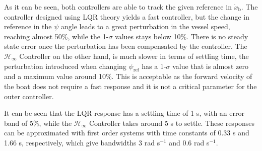 As it can be seen, both controllers are able to track the given reference in $\dot{x}_\mathrm{b}$. The controller designed using LQR theory yields a fast controller, but the change in reference in the $\psi$ angle leads to a great perturbation in the vessel speed, reaching almost 50\%, while the 1-$\sigma$ values stays below 10\%. There is no steady state error once the perturbation has been compensated by the controller. The $\mathcal{H}_\infty$ Controller on the other hand, is much slower in terms of settling time, the perturbation introduced when changing $\psi_\mathrm{ref}$ has a 1-$\sigma$ value that is almost zero and a maximum value around 10\%. This is acceptable as the forward velocity of the boat does not require a fast response and it is not a critical parameter for the outer controller.

It can be seen that the LQR response has a settling time of 1 s, with an error band of 5\%, while the $\mathcal{H}_\infty$ Controller takes around 5 s to settle. These responses can be approximated with first order systems with time constants of \num{0.33} s and \num{1.66} s, respectively, which give bandwidths \num{3} rad s$^{-1}$ and \num{0.6} rad s$^{-1}$.

